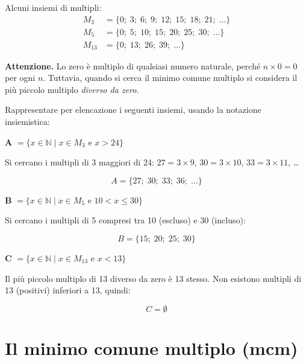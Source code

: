 \begin{esempio}
    Alcuni insiemi di multipli:
    \begin{align*}
        M_3    & = \{0;\; 3;\; 6;\; 9;\; 12;\; 15;\; 18;\; 21;\; \ldots\} \\
        M_5    & = \{0;\; 5;\; 10;\; 15;\; 20;\; 25;\; 30;\; \ldots\}     \\
        M_{13} & = \{0;\; 13;\; 26;\; 39;\; \ldots\}
    \end{align*}
\end{esempio}

\begin{attenzione}
    \textbf{Attenzione.} Lo zero è multiplo di qualsiasi numero naturale, perché
    $n \times 0 = 0$ per ogni $n$. Tuttavia, quando si cerca il minimo comune multiplo
    si considera il più piccolo multiplo \emph{diverso da zero}.
\end{attenzione}

\begin{esempio}
    Rappresentare per elencazione i seguenti insiemi, usando la notazione insiemistica:

    \medskip
    \textbf{A} $= \{x \in \mathbb{N} \mid x \in M_3 \text{ e } x > 24\}$

    Si cercano i multipli di 3 maggiori di 24:
    $27 = 3 \times 9$, $30 = 3 \times 10$, $33 = 3 \times 11$, \ldots

    \[
        A = \{27;\; 30;\; 33;\; 36;\; \ldots\}
    \]

    \medskip
    \textbf{B} $= \{x \in \mathbb{N} \mid x \in M_5 \text{ e } 10 < x \leq 30\}$

    Si cercano i multipli di 5 compresi tra 10 (escluso) e 30 (incluso):

    \[
        B = \{15;\; 20;\; 25;\; 30\}
    \]

    \medskip
    \textbf{C} $= \{x \in \mathbb{N} \mid x \in M_{13} \text{ e } x < 13\}$

    Il più piccolo multiplo di 13 diverso da zero è 13 stesso. Non esistono multipli
    di 13 (positivi) inferiori a 13, quindi:

    \[
        C = \emptyset
    \]
\end{esempio}

\section{Il minimo comune multiplo (mcm)}

